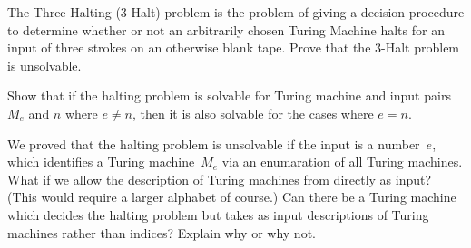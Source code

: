 \documentclass[../../../include/open-logic-section]{subfiles}
\begin{document}
\begin{prob}
The Three Halting (3-Halt) problem is the problem of giving a decision
procedure to determine whether or not an arbitrarily chosen Turing
Machine halts for an input of three strokes on an otherwise blank
tape. Prove that the 3-Halt problem is unsolvable.
\end{prob}

\begin{prob}
Show that if the halting problem is solvable for Turing machine and
input pairs $M_e$ and $n$ where $e \neq n$, then it is also solvable
for the cases where $e = n$.
\end{prob}

\begin{prob}
We proved that the halting problem is unsolvable if the input is a
number~$e$, which identifies a Turing machine~$M_e$ via an enumaration
of all Turing machines.  What if we allow the description of Turing
machines from  directly as input? (This
would require a larger alphabet of course.)  Can there be a Turing
machine which decides the halting problem but takes as input
descriptions of Turing machines rather than indices?  Explain why or
why not.
\end{prob}
\end{document}
